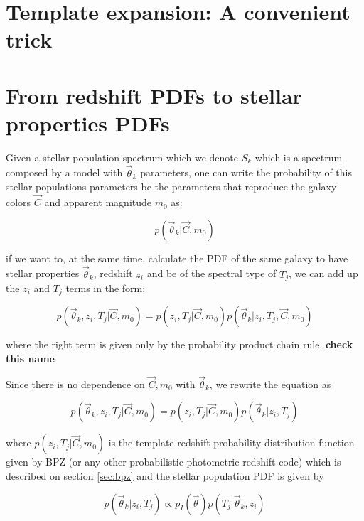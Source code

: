 \documentclass[9pt]{memoir}
\begin{document}
\section{Template expansion: A convenient trick}
\label{sec:TemplateExpansion}


\section{From redshift PDFs to stellar properties PDFs}
\label{sec:fit}

Given a stellar population spectrum which we denote $S_k$ which is a spectrum composed by a model with $\vec{\theta}_k$ parameters, one can write the probability of this stellar populations parameters be the parameters that reproduce the galaxy colors $\vec{C}$ and apparent magnitude $m_0$ as:

\begin{equation}
p(\vec{\theta}_k | \vec{C}, m_0)
\end{equation}

if we want to, at the same time, calculate the PDF of the same galaxy to have stellar properties $\vec{\theta}_k$, redshift $z_i$ and be of the spectral type of $T_j$, we can add up the $z_i$ and $T_j$ terms in the form:

\begin{equation}
p(\vec{\theta}_k, z_i, T_j | \vec{C}, m_0) = p(z_i, T_j|\vec{C}, m_0)p(\vec{\theta}_k|z_i,T_j,\vec{C},m_0)
\end{equation}

\noindent where the right term is given only by the probability product chain rule. \textbf{check this name}

Since there is no dependence on $\vec{C}, m_0$ with $\vec{\theta}_k$, we rewrite the equation as

\begin{equation}
p(\vec{\theta}_k, z_i, T_j | \vec{C}, m_0) = p(z_i, T_j|\vec{C}, m_0)p(\vec{\theta}_k|z_i,T_j)
\end{equation}

\noindent where $p(z_i, T_j|\vec{C}, m_0)$ is the template-redshift probability distribution function given by BPZ (or any other probabilistic photometric redshift code) which is described on section \ref{sec:bpz} and the stellar population PDF is given by

\begin{equation}
\label{eq:stellar_pop_props}
p(\vec{\theta}_k|z_i,T_j) \propto p_I(\vec{\theta}) p(T_j|\vec{\theta}_k, z_i)
\end{equation}
\end{document}
